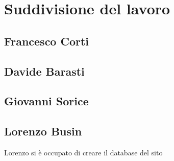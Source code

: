 \newpage

\section{Suddivisione del lavoro}

\subsection{Francesco Corti}

\subsection{Davide Barasti}

\subsection{Giovanni Sorice}

\subsection{Lorenzo Busin}
Lorenzo si è occupato di creare il database del sito